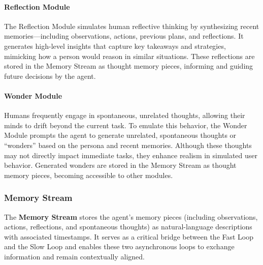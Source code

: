 \documentclass[manuscript,review,anonymous]{acmart}
\begin{document}
\paragraph{Reflection Module}
\label{sec:reflection-module}
The Reflection Module simulates human reflective thinking by synthesizing recent memories—including observations, actions, previous plans, and reflections. It generates high-level insights that capture key takeaways and strategies,  mimicking how a person would reason in similar situations.
These reflections are stored in the Memory Stream as thought memory pieces, informing and guiding future decisions by the agent.

\paragraph{Wonder Module}
\label{sec:wonder-module}
Humans frequently engage in spontaneous, unrelated thoughts, allowing their minds to drift beyond the current task. To emulate this behavior, the Wonder Module prompts the agent to generate unrelated, spontaneous thoughts or ``wonders'' based on the persona and recent memories. Although these thoughts may not directly impact immediate tasks, they enhance realism in simulated user behavior.
Generated wonders are stored in the Memory Stream as thought memory pieces, becoming accessible to other modules.

\subsubsection{Memory Stream}
\label{sec:memory-stream}

The \textbf{Memory Stream} stores the agent's memory pieces (including observations, actions, reflections, and spontaneous thoughts) as natural-language descriptions with associated timestamps.
It serves as a critical bridge between the Fast Loop and the Slow Loop and enables these two asynchronous loops to exchange information and remain contextually aligned.
\end{document}
